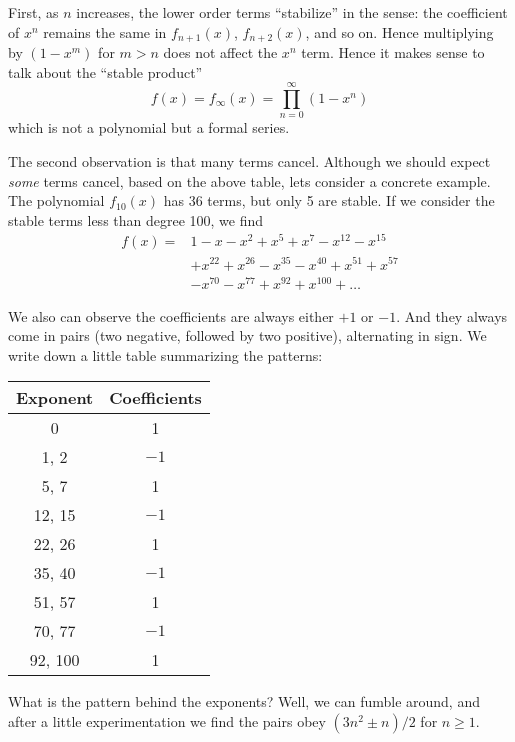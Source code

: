 \documentclass{article}
\begin{document}
First, as $n$ increases, the lower order terms ``stabilize'' in the sense:
the coefficient of $x^{n}$ remains the same in $f_{n+1}(x)$,
$f_{n+2}(x)$, and so on. Hence multiplying by $(1-x^{m})$ for $m>n$ does
not affect the $x^{n}$ term. Hence it makes sense to talk about the
``stable product''
\begin{equation}
f(x) = f_{\infty}(x) = \prod^{\infty}_{n=0}(1-x^{n})
\end{equation}
which is not a polynomial but a formal series.

\M
The second observation is that many terms cancel. Although we should
expect \emph{some} terms cancel, based on the above table, lets consider a
concrete example. The polynomial $f_{10}(x)$ has 36 terms, but only 5
are stable. If we consider the stable terms less than degree 100, we
find
\begin{equation}
  \begin{split}
f(x) =& 1 - x - x^{2} + x^{5} + x^{7} - x^{12} - x^{15} \\
& + x^{22} + x^{26} - x^{35} - x^{40} +x^{51} + x^{57} \\
&- x^{70} - x^{77} + x^{92} + x^{100} + \dots
  \end{split}
\end{equation}

\M
We also can observe the coefficients are always either $+1$ or $-1$. And
they always come in pairs (two negative, followed by two positive),
alternating in sign. We write down a little table summarizing the
patterns: 
\begin{center}
\begin{tabular}{c | c}
  Exponent & Coefficients\\\hline
  0        &    1\\
  1, 2     &   $-1$\\
  5, 7     &    1\\
  12, 15   &   $-1$\\
  22, 26   &    1\\
  35, 40   &   $-1$\\
  51, 57   &    1\\
  70, 77   &   $-1$\\
  92, 100  &    1\\
\end{tabular}
\end{center}
\noindent\ignorespaces%
What is the pattern behind the exponents? Well, we can fumble around,
and after a little experimentation we find the pairs obey $(3n^{2}\pm
n)/2$ for $n\geq1$. 
\end{document}
